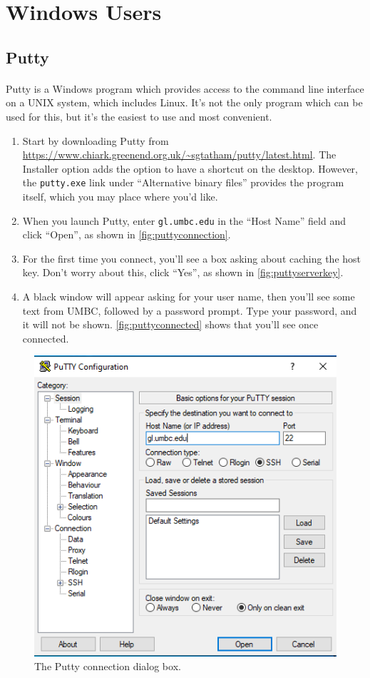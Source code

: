 \documentclass[letter,11pt]{article}
\begin{document}
\section{Windows Users}
\FloatBarrier
\subsection{Putty}
\paragraph{}Putty is a Windows program which provides access to the command line interface on a UNIX system, which includes Linux. It's not the only program which can be used for this, but it's the easiest to use and most convenient.

\begin{enumerate}
    \item Start by downloading Putty from \url{https://www.chiark.greenend.org.uk/~sgtatham/putty/latest.html}. The Installer option adds the option to have a shortcut on the desktop. However, the \texttt{putty.exe} link under ``Alternative binary files'' provides the program itself, which you may place where you'd like.
    \item When you launch Putty, enter \texttt{gl.umbc.edu} in the ``Host Name'' field and click ``Open'', as shown in \autoref{fig:puttyconnection}.
    \item For the first time you connect, you'll see a box asking about caching the host key. Don't worry about this, click ``Yes'', as shown in \autoref{fig:puttyserverkey}.
    \item A black window will appear asking for your user name, then you'll see some text from UMBC, followed by a password prompt. Type your password, and it will not be shown. \autoref{fig:puttyconnected} shows that you'll see once connected.
\end{enumerate}

\begin{figure}
\centering
\includegraphics[scale=0.6]{Images/putty_connect_1.png}
\caption{The Putty connection dialog box.}
\label{fig:puttyconnection}
\end{figure}
\end{document}
